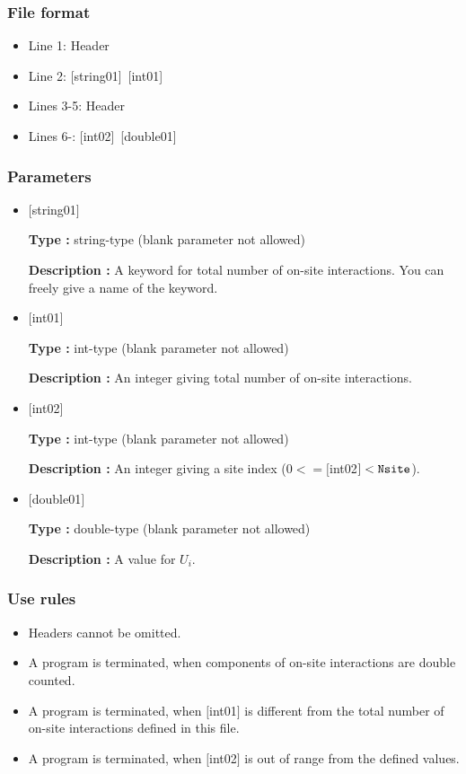 \subsubsection{File format}
 \begin{itemize}
   \item  Line 1:  Header
   \item  Line 2:   [string01]~[int01]
   \item  Lines 3-5:  Header
   \item  Lines 6-:  [int02]~[double01] 
  \end{itemize}
\subsubsection{Parameters}
 \begin{itemize}

   \item  $[$string01$]$
   
    {\bf Type :} string-type (blank parameter not allowed)

   {\bf Description :} A keyword for total number of on-site interactions. You can freely give a name of the keyword.

   \item  $[$int01$]$
   
    {\bf Type :} int-type (blank parameter not allowed)

   {\bf Description :} An integer giving total number of on-site interactions.

  \item  $[$int02$]$
  
 {\bf Type :} int-type (blank parameter not allowed)

{\bf Description :} An integer giving a site index ($0<= [$int02$]<\verb|Nsite|$).
 
 \item  $[$double01$]$
   
   {\bf Type :} double-type (blank parameter not allowed)

  {\bf Description :}  A value for $U_i$.

\end{itemize}

\subsubsection{Use rules}
\begin{itemize}
\item Headers cannot be omitted. 
\item A program is terminated, when components of on-site interactions are double counted.
\item A program is terminated, when $[$int01$]$ is different from the total number of on-site interactions defined in this file.
\item A program is terminated, when $[$int02$]$ is out of range from the defined values.
\end{itemize}


